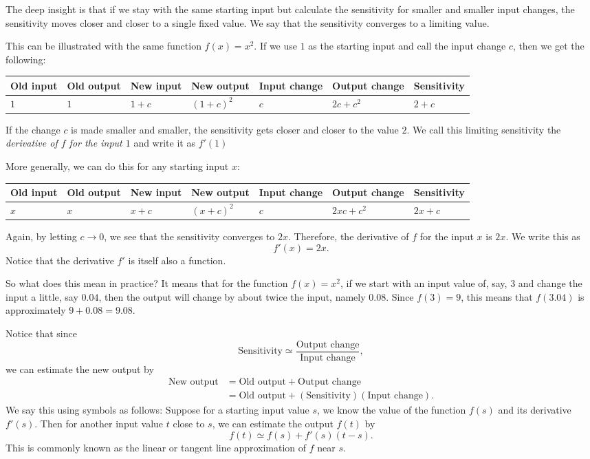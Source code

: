 \documentclass{math-deane}
\begin{document}
The deep insight is that if we stay with the same starting input but calculate the sensitivity for smaller and smaller input changes, the sensitivity moves closer and closer to a single fixed value. We say that the sensitivity converges to a limiting value.

This can be illustrated with the same function $f(x)=x^2$. If we use $1$ as the starting input and call the input change $c$, then we get the following:

\begin{tabular}{|p{0.5in}|p{0.5in}|p{0.5in}|p{0.5in}|p{0.5in}|p{1in}|p{1in}|}
\hline
Old input&Old output&New input& New output & Input change &
Output change & Sensitivity \\ \hline \hline
$1$ & $1$ & $1+c$ & $(1+c)^2$ & $c$ & $2c+c^2$ & $2+c$ \\ \hline
\end{tabular}

If the change $c$ is made smaller and smaller, the sensitivity gets closer and closer to the value $2$. We call this limiting sensitivity the {\em derivative of $f$ for the input $1$} and write it as $f'(1)$

More generally, we can do this for any starting input $x$:

\begin{tabular}{|p{0.5in}|p{0.5in}|p{0.5in}|p{0.5in}|p{0.5in}|p{1in}|p{1in}|}
\hline
Old input&Old output&New input& New output & Input change &
Output change & Sensitivity \\ \hline \hline
$x$ & $x$ & $x+c$ & $(x+c)^2$ & $c$ & $2xc+c^2$ & $2x+c$ \\ \hline
\end{tabular}
Again, by letting $c \rightarrow 0$, we see that the sensitivity converges to $2x$. Therefore, the derivative of $f$ for the input $x$ is $2x$. We write this as
\[ f'(x) = 2x. \]
Notice that the derivative $f'$ is itself also a function.

So what does this mean in practice? It means that for the function $f(x) = x^2$, if we start with an input value of, say, $3$ and change the input a little, say $0.04$, then the output will change by about twice the input, namely $0.08$. Since $f(3) = 9$, this means that $f(3.04)$ is approximately $9 + 0.08 = 9.08$.

Notice that since
\[
\text{Sensitivity} \simeq \frac{\text{Output change}}{\text{Input change}},
\]
we can estimate the new output by
\begin{align*}
\text{New output} &= \text{Old output} + \text{Output change}\\
&= \text{Old output} + (\text{Sensitivity})(\text{Input change}).
\end{align*}
We say this using symbols as follows: Suppose for a starting input value $s$, we know the value of the function $f(s)$ and its derivative $f'(s)$. Then for another input value $t$ close to $s$, we can estimate the output $f(t)$ by
\[
f(t) \simeq f(s) + f'(s)(t-s).
\]
This is commonly known as the linear or tangent line approximation of $f$ near $s$.
\end{document}
